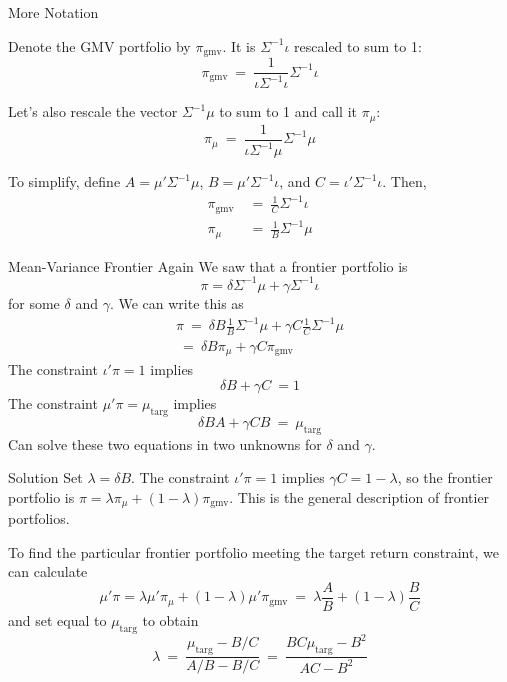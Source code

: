 \documentclass[xcolor=dvipsnames,10pt]{beamer}
\begin{document}
\begin{frame}{More Notation}

Denote the GMV portfolio by $\pi_{\text{gmv}}$.  It is $\Sigma^{-1}\iota$ rescaled to sum to 1:
$$\pi_{\text{gmv}} \ = \ \frac{1}{\iota\Sigma^{-1}\iota}\Sigma^{-1}\iota$$

Let's also rescale the vector $\Sigma^{-1}\mu$ to sum to 1 and call it $\pi_\mu$:
$$\pi_\mu \ = \ \frac{1}{\iota\Sigma^{-1}\mu}\Sigma^{-1}\mu$$

To simplify, 
define
$A = \mu'\Sigma^{-1}\mu$, $ B = \mu'\Sigma^{-1}\iota$, and $C = \iota '\Sigma^{-1}\iota$.  
Then,
\begin{align*}
\pi_{\text{gmv}} \ & = \ \frac{1}{C}\Sigma^{-1}\iota\\
\pi_\mu \ & = \ \frac{1}{B}\Sigma^{-1}\mu
\end{align*}
\end{frame}

\begin{frame}{Mean-Variance Frontier Again}
We saw that a frontier portfolio is
$$\pi = \delta \Sigma^{-1}\mu + \gamma\Sigma^{-1}\iota$$
for some $\delta$ and $\gamma$.  We can write this as
\begin{align*}
\pi \ = \ \delta B \frac{1}{B}\Sigma^{-1}\mu + \gamma C \frac{1}{C}\Sigma^{-1}\mu\\
\ = \ \delta B \pi_\mu + \gamma C \pi_{\text{gmv}}
\end{align*}
The constraint $\iota'\pi=1$ implies 
$$\delta B + \gamma C \ = 1$$  The constraint
$\mu'\pi = \mu_{\text{targ}}$ implies 
$$\delta BA + \gamma CB \ = \ \mu_{\text{targ}}$$
Can solve these two equations in two unknowns for $\delta$ and $\gamma$.

\end{frame}

\begin{frame}{Solution}
Set $\lambda = \delta B$.  The constraint $\iota'\pi=1$ implies $\gamma C = 1-\lambda$, so the frontier portfolio is $\pi = \lambda \pi_\mu + (1-\lambda)\pi_{\text{gmv}}$.  This is the general description of frontier portfolios.

To find the particular frontier portfolio meeting the target return constraint, we can calculate
$$\mu'\pi = \lambda \mu'\pi_\mu + (1-\lambda) \mu'\pi_{\text{gmv}} \ = \ \lambda \frac{A}{B} + (1-\lambda)\frac{B}{C}$$ 
and set equal to $\mu_{\text{targ}}$ to obtain
$$\lambda \ = \ \frac{\mu_{\text{targ}} - B/C}{A/B - B/C} \ = \ \frac{BC\mu_{\text{targ}} - B^2}{AC - B^2}$$
\end{frame}
\end{document}
